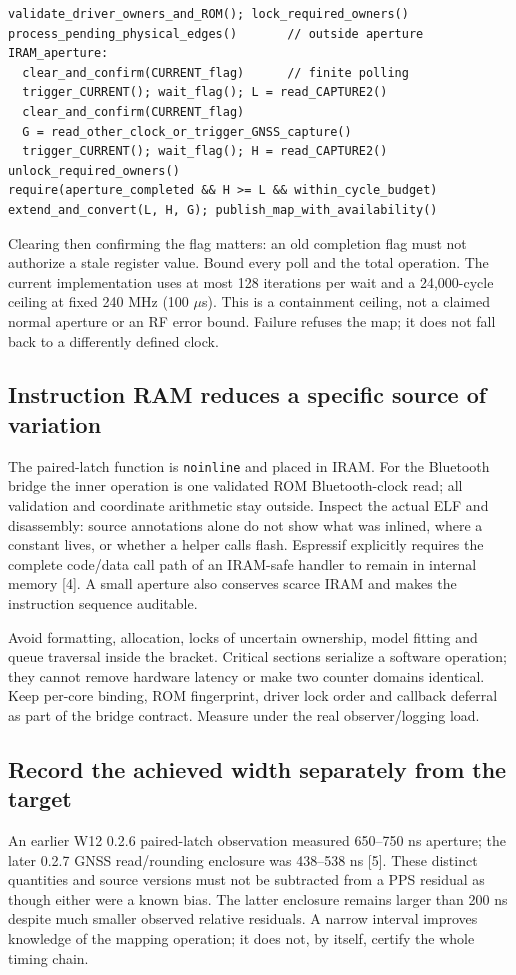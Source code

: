 \documentclass[10pt,letterpaper]{article}
\newcommand{\src}[1]{\nolinkurl{#1}}
\begin{document}
\begin{lstlisting}
validate_driver_owners_and_ROM(); lock_required_owners()
process_pending_physical_edges()       // outside aperture
IRAM_aperture:
  clear_and_confirm(CURRENT_flag)      // finite polling
  trigger_CURRENT(); wait_flag(); L = read_CAPTURE2()
  clear_and_confirm(CURRENT_flag)
  G = read_other_clock_or_trigger_GNSS_capture()
  trigger_CURRENT(); wait_flag(); H = read_CAPTURE2()
unlock_required_owners()
require(aperture_completed && H >= L && within_cycle_budget)
extend_and_convert(L, H, G); publish_map_with_availability()
\end{lstlisting}

Clearing then confirming the flag matters: an old completion flag must not authorize a stale register value. Bound every poll and the total operation. The current implementation uses at most 128 iterations per wait and a 24,000-cycle ceiling at fixed 240 MHz (100 $\mu$s). This is a containment ceiling, not a claimed normal aperture or an RF error bound. Failure refuses the map; it does not fall back to a differently defined clock.

\subsection{Instruction RAM reduces a specific source of variation}
The paired-latch function is \src{noinline} and placed in IRAM. For the Bluetooth bridge the inner operation is one validated ROM Bluetooth-clock read; all validation and coordinate arithmetic stay outside. Inspect the actual ELF and disassembly: source annotations alone do not show what was inlined, where a constant lives, or whether a helper calls flash. Espressif explicitly requires the complete code/data call path of an IRAM-safe handler to remain in internal memory [4]. A small aperture also conserves scarce IRAM and makes the instruction sequence auditable.

Avoid formatting, allocation, locks of uncertain ownership, model fitting and queue traversal inside the bracket. Critical sections serialize a software operation; they cannot remove hardware latency or make two counter domains identical. Keep per-core binding, ROM fingerprint, driver lock order and callback deferral as part of the bridge contract. Measure under the real observer/logging load.

\subsection{Record the achieved width separately from the target}
An earlier W12 0.2.6 paired-latch observation measured 650--750 ns aperture; the later 0.2.7 GNSS read/rounding enclosure was 438--538 ns [5]. These distinct quantities and source versions must not be subtracted from a PPS residual as though either were a known bias. The latter enclosure remains larger than 200 ns despite much smaller observed relative residuals. A narrow interval improves knowledge of the mapping operation; it does not, by itself, certify the whole timing chain.
\end{document}
